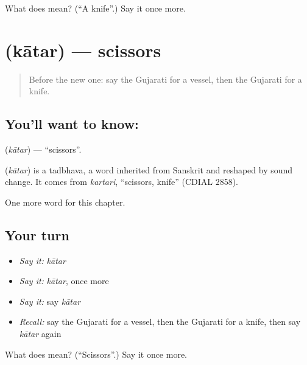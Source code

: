 \begin{tcolorbox}[breakable,colback=teal!4,colframe=teal!35!black,title={Before you move on}]
What does  mean? (\textquotedblleft{}A knife\textquotedblright{}.) Say it once more.
\end{tcolorbox}
\section[\texorpdfstring{\gu{કાતર} (kātar)}{કાતર (kātar)}]{ (kātar) — scissors}

\label{lesson:GU-C108-katar}



\begin{quote}
Before the new one: say the Gujarati for a vessel, then the Gujarati for a knife.
\end{quote}

\subsection*{You'll want to know: }
\textbf{} (\emph{kātar}) — \textquotedblleft{}scissors\textquotedblright{}.

\begin{cousinweb}
\textbf{} (\emph{kātar}) is a tadbhava, a word inherited from Sanskrit and reshaped by sound change. It comes from \emph{kartari}, \textquotedblleft{}scissors, knife\textquotedblright{} (CDIAL 2858).
\end{cousinweb}

\begin{grammarlens}[title={What you've built}]
One more word for this chapter.
\end{grammarlens}

\subsection*{Your turn}
\begin{itemize}
\raggedright
  \item \emph{Say it:} \emph{kātar}
  \item \emph{Say it:} \emph{kātar}, once more
  \item \emph{Say it:} say \emph{kātar}
  \item \emph{Recall:} say the Gujarati for a vessel, then the Gujarati for a knife, then say \emph{kātar} again
\end{itemize}

\begin{tcolorbox}[breakable,colback=teal!4,colframe=teal!35!black,title={Before you move on}]
What does  mean? (\textquotedblleft{}Scissors\textquotedblright{}.) Say it once more.
\end{tcolorbox}
